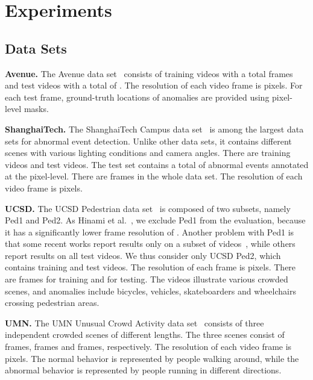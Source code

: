 \documentclass[10pt,twocolumn,letterpaper]{article}
\begin{document}
\vspace*{-0.2cm}
\section{Experiments}
\label{sec_Experiments}

\vspace*{-0.1cm}
\subsection{Data Sets}
\vspace*{-0.1cm}



\noindent
{\bf Avenue.}
The Avenue data set~\cite{Lu-ICCV-2013} consists of  training videos with a total  frames and  test videos with a total of . The resolution of each video frame is  pixels. For each test frame, ground-truth locations of anomalies are provided using pixel-level masks. 

\noindent
{\bf ShanghaiTech.}
The ShanghaiTech Campus data set~\cite{Luo-ICCV-2017} is among the largest data sets for abnormal event detection. Unlike other data sets, it contains  different scenes with various lighting conditions and camera angles. There are  training videos and  test videos. The test set contains a total of  abnormal events annotated at the pixel-level. There are  frames in the whole data set. The resolution of each video frame is  pixels.


\noindent
{\bf UCSD.}
The UCSD Pedestrian data set~\cite{Mahadevan-CVPR-2010} is composed of two subsets, namely Ped1 and Ped2. As Hinami et al.~\cite{Hinami-ICCV-2017}, we exclude Ped1 from the evaluation, because it has a significantly lower frame resolution of . Another problem with Ped1 is that some recent works report results only on a subset of  videos~\cite{Ravanbakhsh-WACV-2018,Ravanbakhsh-ICIP-2017,Xu-BMVC-2015}, while others~\cite{Ionescu-ICCV-2017,Mahadevan-CVPR-2010,Liu-CVPR-2018,Liu-BMVC-2018} report results on all  test videos.
We thus consider only UCSD Ped2, which contains  training and  test videos. The resolution of each frame is  pixels. There are  frames for training and  for testing. The videos illustrate various crowded scenes, and anomalies include bicycles, vehicles, skateboarders and wheelchairs crossing pedestrian areas.

\noindent
{\bf UMN.}
The UMN Unusual Crowd Activity data set~\cite{Mehran-CVPR-2009} consists of three independent crowded scenes of different lengths. The three scenes consist of  frames,  frames and  frames, respectively. The resolution of each video frame is  pixels. The normal behavior is represented by people walking around, while the abnormal behavior is represented by people running in different directions.
\end{document}
